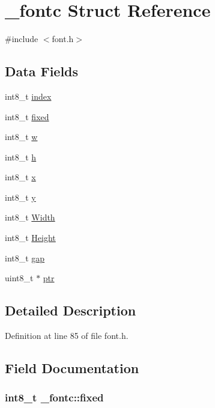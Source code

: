 \hypertarget{struct__fontc}{\section{\-\_\-fontc Struct Reference}
\label{struct__fontc}
}


{\ttfamily \#include $<$font.\-h$>$}

\subsection*{Data Fields}
\begin{DoxyCompactItemize}
\item 
int8\-\_\-t \hyperlink{struct__fontc_a7cc0370744ff7ea964054d36917c9a2f}{index}
\item 
int8\-\_\-t \hyperlink{struct__fontc_aec700f6ada95d1bced81fc2728633878}{fixed}
\item 
int8\-\_\-t \hyperlink{struct__fontc_a9c2af0354d2b2009e7b6684e25fd479b}{w}
\item 
int8\-\_\-t \hyperlink{struct__fontc_a9feb8c838dfc1d4eebb15c8e53981944}{h}
\item 
int8\-\_\-t \hyperlink{struct__fontc_ad15d00ed46ebe52a085cf05b5ca5da90}{x}
\item 
int8\-\_\-t \hyperlink{struct__fontc_aebbde0dc41068722ee1a69f4a56478a4}{y}
\item 
int8\-\_\-t \hyperlink{struct__fontc_ae3c802e1c35ae9a4e37c8eb2e9644325}{Width}
\item 
int8\-\_\-t \hyperlink{struct__fontc_a98f97c237dfb1027c38813a17ef6dcd6}{Height}
\item 
int8\-\_\-t \hyperlink{struct__fontc_a38c23e7e200346fce3777d4efa30488f}{gap}
\item 
uint8\-\_\-t $\ast$ \hyperlink{struct__fontc_a60a3fef5ccd80dff543aac3f22f74876}{ptr}
\end{DoxyCompactItemize}


\subsection{Detailed Description}


Definition at line 85 of file font.\-h.



\subsection{Field Documentation}
\hypertarget{struct__fontc_aec700f6ada95d1bced81fc2728633878}{
\subsubsection[{fixed}]{\setlength{\rightskip}{0pt plus 5cm}int8\-\_\-t \-\_\-fontc\-::fixed}}\label{struct__fontc_aec700f6ada95d1bced81fc2728633878}


